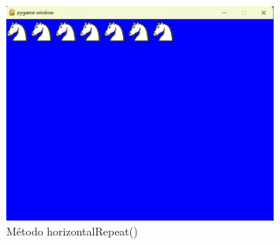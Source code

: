 \documentclass{article}
\begin{document}
\begin{itemize}
\begin{figure}[H]
      \includegraphics[width=0.8\textwidth, keepaspectratio]{img/repeath.png}
      \caption{Método horizontalRepeat()}
    \end{figure}
  \end{itemize}
  
\end{document}
